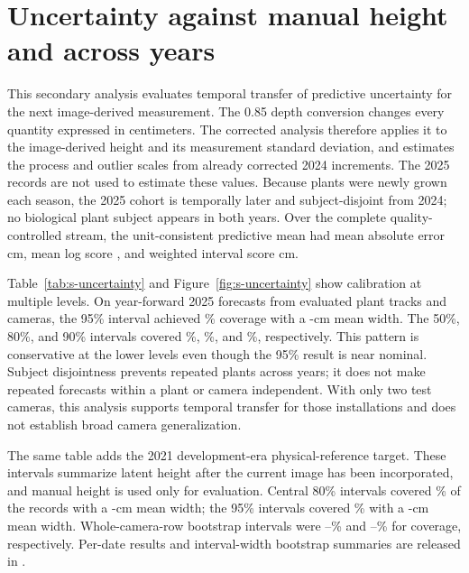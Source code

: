 \documentclass[review,12pt,authoryear]{elsarticle}
\begin{document}
\section{Uncertainty against manual height and across years}
\label{sec:s-uncertainty}

This secondary analysis evaluates temporal transfer of predictive uncertainty for the next image-derived measurement. The 0.85 depth conversion changes every quantity expressed in centimeters. The corrected analysis therefore applies it to the image-derived height and its measurement standard deviation, and estimates the process and outlier scales from already corrected 2024 increments. The 2025 records are not used to estimate these values. Because plants were newly grown each season, the 2025 cohort is temporally later and subject-disjoint from 2024; no biological plant subject appears in both years. Over the complete quality-controlled stream, the unit-consistent predictive mean had mean absolute error \ForecastBayesMAE{} cm, mean log score \CalibratedLogScore{}, and weighted interval score \CalibratedWIS{} cm.

Table~\ref{tab:s-uncertainty} and Figure~\ref{fig:s-uncertainty} show calibration at multiple levels. On \UncertaintyTestN{} year-forward 2025 forecasts from \UncertaintyTestPlants{} evaluated plant tracks and \UncertaintyTestCameras{} cameras, the 95\% interval achieved \UncertaintyTestCoverageNinetyFive{}\% coverage with a \UncertaintyTestWidthNinetyFive{}-cm mean width. The 50\%, 80\%, and 90\% intervals covered \UncertaintyTestCoverageFifty{}\%, \UncertaintyTestCoverageEighty{}\%, and \UncertaintyTestCoverageNinety{}\%, respectively. This pattern is conservative at the lower levels even though the 95\% result is near nominal. Subject disjointness prevents repeated plants across years; it does not make repeated forecasts within a plant or camera independent. With only two test cameras, this analysis supports temporal transfer for those installations and does not establish broad camera generalization.

The same table adds the 2021 development-era physical-reference target. These intervals summarize latent height after the current image has been incorporated, and manual height is used only for evaluation. Central 80\% intervals covered \FieldCoverageEighty{}\% of the \FieldN{} records with a \FieldIntervalWidthEighty{}-cm mean width; the 95\% intervals covered \FieldCoverageNinetyFive{}\% with a \FieldIntervalWidthNinetyFive{}-cm mean width. Whole-camera-row bootstrap intervals were \FieldCoverageEightyLo{}--\FieldCoverageEightyHi{}\% and \FieldCoverageNinetyFiveLo{}--\FieldCoverageNinetyFiveHi{}\% for coverage, respectively. Per-date results and interval-width bootstrap summaries are released in .
\end{document}
